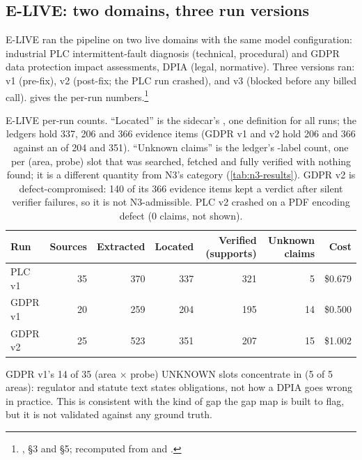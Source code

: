 \subsection{E-LIVE: two domains, three run versions}

\evobs{} E-LIVE ran the pipeline on two live domains with the same model configuration:
industrial PLC intermittent-fault diagnosis (technical, procedural) and GDPR data protection impact
assessments, DPIA (legal, normative). Three versions ran: v1 (pre-fix), v2 (post-fix; the PLC run
crashed), and v3 (blocked before any billed call).  gives the per-run
numbers.\footnote{, \S3 and \S5; recomputed from
 and .}

\begin{table}[tbp]
  \centering
  \small
  \caption{E-LIVE per-run counts. \enquote{Located} is the sidecar's , one
  definition for all runs; the ledgers hold 337, 206 and 366 evidence items (GDPR v1 and v2 hold 206 and 366
  against an  of 204 and 351). \enquote{Unknown claims} is
  the ledger's -label count, one per (area, probe) slot that was searched, fetched and
  fully verified with nothing found; it is a different quantity from N3's  category
  (\cref{tab:n3-results}). GDPR v2 is defect-compromised: 140 of its 366 evidence items kept a
   verdict after silent verifier failures, so it is not N3-admissible. PLC v2 crashed on
  a PDF encoding defect (0 claims, not shown).}
  \label{tab:n2-elive}
  \begin{tabularx}{\linewidth}{@{}lrrrrrr@{}}
    \toprule
    Run & Sources & Extracted & Located & Verified (supports) & Unknown claims & Cost \\
    \midrule
    PLC v1 & 35 & 370 & 337 & 321 & 5 & \$0.679 \\
    GDPR v1 & 20 & 259 & 204 & 195 & 14 & \$0.500 \\
    GDPR v2 & 25 & 523 & 351 & 207 & 15 & \$1.002 \\
    \bottomrule
  \end{tabularx}
\end{table}

GDPR v1's 14 of 35 (area $\times$ probe) UNKNOWN slots concentrate in  (5 of 5
areas): regulator and statute text states obligations, not how a DPIA goes wrong in practice.
\evint{} This is consistent with the kind of gap the gap map is built to flag, but it is not
validated against any ground truth.


